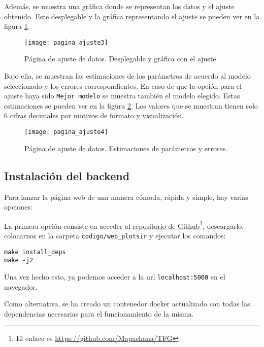 Además, se muestra una gráfica donde se representan los datos y el ajuste obtenido. Este desplegable y la gráfica representando el ajuste se pueden ver en la figura \ref{manual: ajuste3}.

\begin{figure}
\begin{center}
\caption{Página de ajuste de datos. Desplegable y gráfica con el ajuste.}
\label{manual: ajuste3}
\texttt{[image: pagina\_ajuste3]}
\end{center}
\end{figure}

Bajo ella, se muestran las estimaciones de los parámetros de acuerdo al modelo seleccionado y los errores correspondientes. En caso de que la opción para el ajuste haya sido \verb|Mejor modelo| se muestra también el modelo elegido. Estas estimaciones se pueden ver en la figura \ref{manual: ajuste4}. Los valores que se muestran tienen solo 6 cifras decimales por motivos de formato y visualización.

\begin{figure}
\begin{center}
\caption{Página de ajuste de datos. Estimaciones de parámetros y errores.}
\label{manual: ajuste4}
\texttt{[image: pagina\_ajuste4]}
\end{center}
\end{figure}


\subsection{Instalación del backend}

Para lanzar la página web de una manera cómoda, rápida y simple, hay varias opciones:

La primera opción consiste en acceder al \href{https://github.com/Mapachana/TFG}{repositorio de Github}\footnote{El enlace es \href{https://github.com/Mapachana/TFG}{https://github.com/Mapachana/TFG}}, descargarlo, colocarnos en la carpeta \verb|codigo/web_plotsir| y ejecutar los comandos:

\begin{verbatim}
make install_deps
make -j2
\end{verbatim}

Una vez hecho esto, ya podemos acceder a la url \verb|localhost:5000| en el navegador.

Como alternativa, se ha creado un contenedor docker actualizado con todas las dependencias necesarias para el funcionamiento de la misma.


